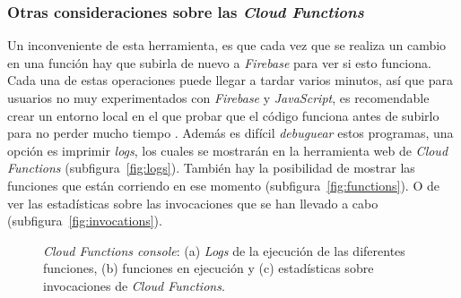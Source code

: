 \subsubsection{Otras consideraciones sobre las \textit{Cloud Functions}}
Un inconveniente de esta herramienta, es que cada vez que se realiza un cambio en una función hay que subirla de nuevo a \textit{Firebase} para ver si esto funciona. Cada una de estas operaciones puede llegar a tardar varios minutos, así que para usuarios no muy experimentados con \textit{Firebase} y \textit{JavaScript}, es recomendable crear un entorno local en el que probar que el código funciona antes de subirlo para no perder mucho tiempo \cite{noauthor_cloud_nodate}.
Además es difícil \textit{debuguear} estos programas, una opción es imprimir \textit{logs}, los cuales se mostrarán en la herramienta web de \textit{Cloud Functions} (subfigura~\ref{fig:logs}). 
También hay la posibilidad de mostrar las funciones que están corriendo en ese momento (subfigura~\ref{fig:functions}).
O de ver las estadísticas sobre las invocaciones que se han llevado a cabo (subfigura~\ref{fig:invocations}).

\begin{figure}[tbp]
\centering
{}
\caption{\textit{Cloud Functions console}: (a) \textit{Logs} de la ejecución de las diferentes funciones, (b) funciones en ejecución y (c) estadísticas sobre invocaciones de \textit{Cloud Functions}.}
\end{figure}

